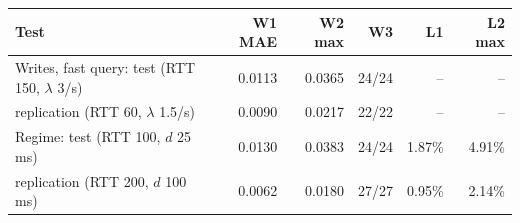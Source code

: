 \begin{tabular}{lrrrrr}
\toprule
Test & W1 MAE & W2 max & W3 & L1 & L2 max \\
\midrule
Writes, fast query: test (RTT 150, $\lambda$ 3/s) & 0.0113 & 0.0365 & 24/24 & -- & -- \\
\quad replication (RTT 60, $\lambda$ 1.5/s) & 0.0090 & 0.0217 & 22/22 & -- & -- \\
Regime: test (RTT 100, $d$ 25 ms) & 0.0130 & 0.0383 & 24/24 & 1.87\% & 4.91\% \\
\quad replication (RTT 200, $d$ 100 ms) & 0.0062 & 0.0180 & 27/27 & 0.95\% & 2.14\% \\
\bottomrule
\end{tabular}
